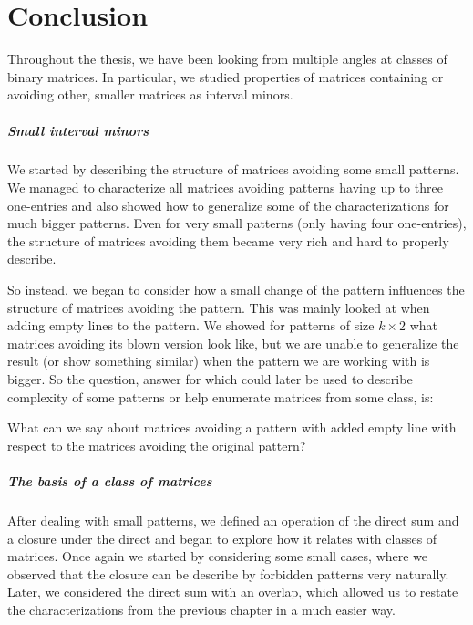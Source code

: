 \chapter*{Conclusion}
Throughout the thesis, we have been looking from multiple angles at classes of binary matrices. In particular, we studied properties of matrices containing or avoiding other, smaller matrices as interval minors.

\paragraph{Small interval minors}
We started by describing the structure of matrices avoiding some small patterns. We managed to characterize all matrices avoiding patterns having up to three one-entries and also showed how to generalize some of the characterizations for much bigger patterns. Even for very small patterns (only having four one-entries), the structure of matrices avoiding them became very rich and hard to properly describe.

So instead, we began to consider how a small change of the pattern influences the structure of matrices avoiding the pattern. This was mainly looked at when adding empty lines to the pattern. We showed for patterns of size $k\times2$ what matrices avoiding its blown version look like, but we are unable to generalize the result (or show something similar) when the pattern we are working with is bigger. So the question, answer for which could later be used to describe complexity of some patterns or help enumerate matrices from some class, is:
\begin{ques}
What can we say about matrices avoiding a pattern with added empty line with respect to the matrices avoiding the original pattern?
\end{ques}

\paragraph{The basis of a class of matrices}
After dealing with small patterns, we defined an operation of the direct sum and a closure under the direct and began to explore how it relates with classes of matrices. Once again we started by considering some small cases, where we observed that the closure can be describe by forbidden patterns very naturally. Later, we considered the direct sum with an overlap, which allowed us to restate the characterizations from the previous chapter in a much easier way.

